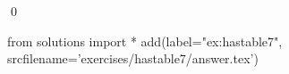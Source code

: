 
\begin{ex} 
  \label{ex:hastable7}
  
  \qed
\end{ex} 
\begin{python0}
from solutions import *
add(label="ex:hastable7",
    srcfilename='exercises/hastable7/answer.tex') 
\end{python0}
